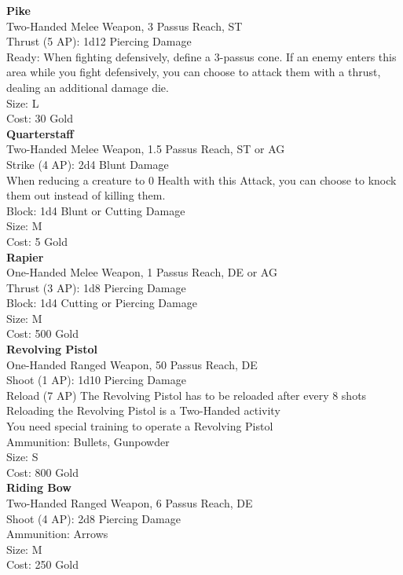 \textbf{Pike}\\
Two-Handed Melee Weapon, 3 Passus Reach, ST\\
Thrust (5 AP): 1d12 Piercing Damage\\
Ready: When fighting defensively, define a 3-passus cone. If an enemy enters this area while you fight defensively, you can choose to attack them with a thrust, dealing an additional damage die.\\
Size: L\\
Cost: 30 Gold\\


\textbf{Quarterstaff}\\
Two-Handed Melee Weapon, 1.5 Passus Reach, ST or AG\\
Strike (4 AP): 2d4 Blunt Damage\\
When reducing a creature to 0 Health with this Attack, you can choose to knock them out instead of killing them.\\
Block: 1d4 Blunt or Cutting Damage\\
Size: M\\
Cost: 5 Gold\\


\textbf{Rapier}\\
One-Handed Melee Weapon, 1 Passus Reach, DE or AG\\
Thrust (3 AP): 1d8 Piercing Damage\\
Block: 1d4 Cutting or Piercing Damage\\
Size: M\\
Cost: 500 Gold\\


\textbf{Revolving Pistol}\\
One-Handed Ranged Weapon, 50 Passus Reach, DE\\
Shoot (1 AP): 1d10 Piercing Damage\\
Reload (7 AP) The Revolving Pistol has to be reloaded after every 8 shots\\
Reloading the Revolving Pistol is a Two-Handed activity\\
You need special training to operate a Revolving Pistol\\
Ammunition: Bullets, Gunpowder\\
Size: S\\
Cost: 800 Gold\\


\textbf{Riding Bow}\\
Two-Handed Ranged Weapon, 6 Passus Reach, DE\\
Shoot (4 AP): 2d8 Piercing Damage\\
Ammunition: Arrows\\
Size: M\\
Cost: 250 Gold\\


